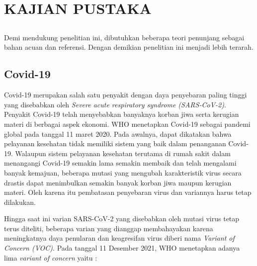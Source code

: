 \chapter{KAJIAN PUSTAKA}

\section*{ }
Demi mendukung penelitian ini, dibutuhkan beberapa teori penunjang sebagai bahan acuan dan referensi. 
Dengan demikian penelitian ini menjadi lebih terarah.
\vspace{1ex}

\section{Covid-19}

Covid-19 merupakan salah satu penyakit dengan daya penyebaran paling tinggi yang disebabkan oleh \textit{Severe
acute respiratory syndrome (SARS-CoV-2)}. Penyakit Covid-19 telah menyebabkan banyaknya korban jiwa serta kerugian
materi di berbagai aspek ekonomi. WHO menetapkan Covid-19 sebagai pandemi global pada tanggal 11 maret 2020. Pada
awalnya, dapat dikatakan bahwa pelayanan kesehatan tidak memiliki sistem yang baik dalam penanganan Covid-19.
Walaupun sistem pelayanan kesehatan terutama di rumah sakit dalam menangangi Covid-19 semakin lama semakin membaik
dan telah mengalami banyak kemajuan, beberapa mutasi yang mengubah karakteristik virus secara drastis dapat menimbulkan
semakin banyak korban jiwa maupun kerugian materi. Oleh karena itu pembatasan penyebaran virus dan variannya 
harus tetap dilakukan.

Hingga saat ini varian SARS-CoV-2 yang disebabkan oleh mutasi virus tetap terus diteliti, beberapa varian yang 
dianggap membahayakan karena meningkatnya daya penularan dan keagresifan virus diberi nama \textit{Variant 
of Concern (VOC)}.
Pada tanggal 11 Desember 2021, WHO menetapkan adanya lima \textit{variant of concern} yaitu :

